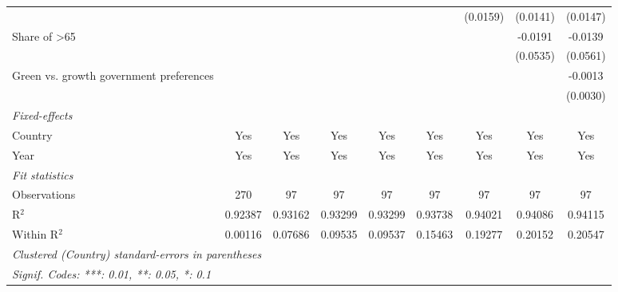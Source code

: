 \begin{table}[htbp]
\begin{tabular}{lcccccccc}
                                                  &          &          &          &          &              & (0.0159)     & (0.0141)     & (0.0147)\\   
      Share of >65                                &          &          &          &          &              &              & -0.0191      & -0.0139\\   
                                                  &          &          &          &          &              &              & (0.0535)     & (0.0561)\\   
      Green vs. growth government preferences     &          &          &          &          &              &              &              & -0.0013\\   
                                                  &          &          &          &          &              &              &              & (0.0030)\\   
      \midrule
      \emph{Fixed-effects}\\
      Country                                     & Yes      & Yes      & Yes      & Yes      & Yes          & Yes          & Yes          & Yes\\  
      Year                                        & Yes      & Yes      & Yes      & Yes      & Yes          & Yes          & Yes          & Yes\\  
      \midrule
      \emph{Fit statistics}\\
      Observations                                & 270      & 97       & 97       & 97       & 97           & 97           & 97           & 97\\  
      R$^2$                                       & 0.92387  & 0.93162  & 0.93299  & 0.93299  & 0.93738      & 0.94021      & 0.94086      & 0.94115\\  
      Within R$^2$                                & 0.00116  & 0.07686  & 0.09535  & 0.09537  & 0.15463      & 0.19277      & 0.20152      & 0.20547\\  
      \midrule \midrule
      \multicolumn{9}{l}{\emph{Clustered (Country) standard-errors in parentheses}}\\
      \multicolumn{9}{l}{\emph{Signif. Codes: ***: 0.01, **: 0.05, *: 0.1}}\\
   \end{tabular}
\end{table}


